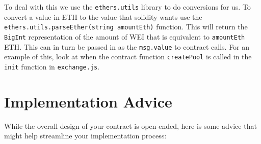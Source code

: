 \documentclass[11pt]{article}
\begin{document}
To deal with this we use the \texttt{ethers.utils} library to do conversions for us. To convert a value in ETH to the value that solidity wants use the \texttt{ethers.utils.parseEther(string amountEth)} function. This will return the \texttt{BigInt} representation of the amount of WEI that is equivalent to \texttt{amountEth} ETH. This can in turn be passed in as the \texttt{msg.value} to contract calls. For an example of this, look at when the contract function \texttt{createPool} is called in the \texttt{init} function in \texttt{exchange.js}.

\section{Implementation Advice}
While the overall design of your contract is open-ended, here is some advice that might help streamline your implementation process:
\end{document}
